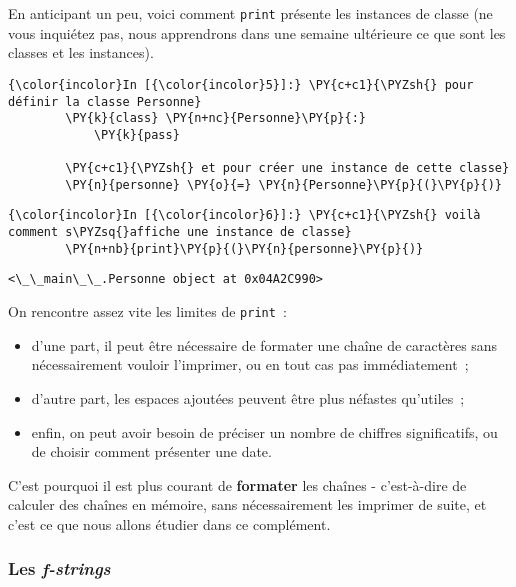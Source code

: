     En anticipant un peu, voici comment \texttt{print} présente les
instances de classe (ne vous inquiétez pas, nous apprendrons dans une
semaine ultérieure ce que sont les classes et les instances).

    \begin{Verbatim}[commandchars=\\\{\}]
{\color{incolor}In [{\color{incolor}5}]:} \PY{c+c1}{\PYZsh{} pour définir la classe Personne}
        \PY{k}{class} \PY{n+nc}{Personne}\PY{p}{:}
            \PY{k}{pass}
        
        \PY{c+c1}{\PYZsh{} et pour créer une instance de cette classe}
        \PY{n}{personne} \PY{o}{=} \PY{n}{Personne}\PY{p}{(}\PY{p}{)}
\end{Verbatim}


    \begin{Verbatim}[commandchars=\\\{\}]
{\color{incolor}In [{\color{incolor}6}]:} \PY{c+c1}{\PYZsh{} voilà comment s\PYZsq{}affiche une instance de classe}
        \PY{n+nb}{print}\PY{p}{(}\PY{n}{personne}\PY{p}{)}
\end{Verbatim}


    \begin{Verbatim}[commandchars=\\\{\}]
<\_\_main\_\_.Personne object at 0x04A2C990>

    \end{Verbatim}

    On rencontre assez vite les limites de \texttt{print}~:

\begin{itemize}
\tightlist
\item
  d'une part, il peut être nécessaire de formater une chaîne de
  caractères sans nécessairement vouloir l'imprimer, ou en tout cas pas
  immédiatement~;
\item
  d'autre part, les espaces ajoutées peuvent être plus néfastes
  qu'utiles~;
\item
  enfin, on peut avoir besoin de préciser un nombre de chiffres
  significatifs, ou de choisir comment présenter une date.
\end{itemize}

C'est pourquoi il est plus courant de \textbf{formater} les chaînes -
c'est-à-dire de calculer des chaînes en mémoire, sans nécessairement les
imprimer de suite, et c'est ce que nous allons étudier dans ce
complément.

    \hypertarget{les-f-strings}{%
\subsubsection{\texorpdfstring{Les
\emph{f-strings}}{Les f-strings}}\label{les-f-strings}}

